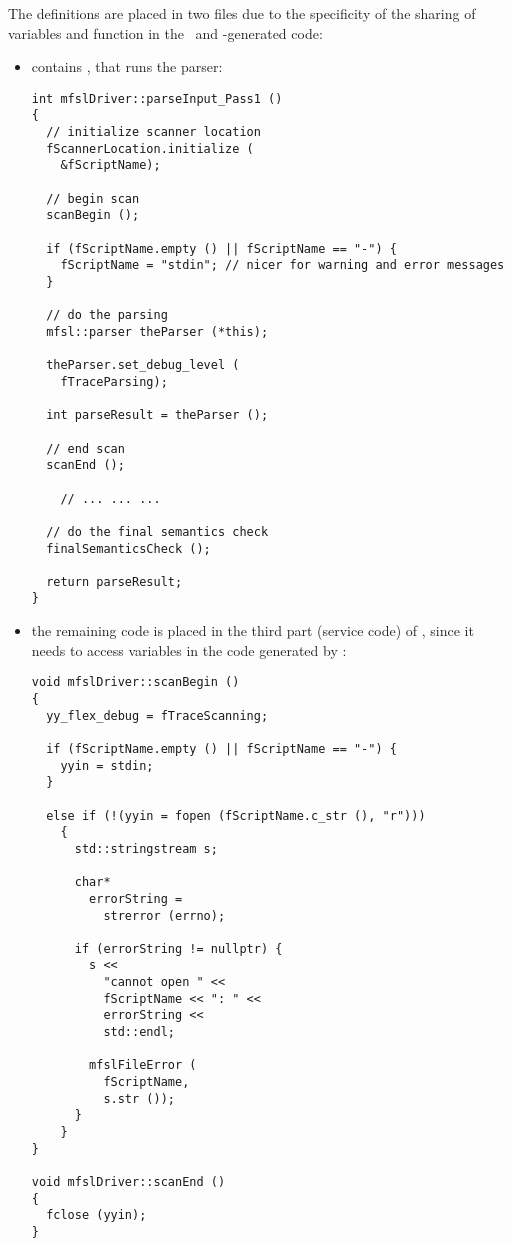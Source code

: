 The definitions are placed in two files due to the specificity of the sharing of variables and function in the \flex\ and \bison-generated code: %
\begin{itemize}

\item {} contains , that runs the parser:
\begin{lstlisting}[language=CPlusPlus]
int mfslDriver::parseInput_Pass1 ()
{
  // initialize scanner location
  fScannerLocation.initialize (
    &fScriptName);

  // begin scan
  scanBegin ();

  if (fScriptName.empty () || fScriptName == "-") {
    fScriptName = "stdin"; // nicer for warning and error messages
  }

  // do the parsing
  mfsl::parser theParser (*this);

  theParser.set_debug_level (
    fTraceParsing);

  int parseResult = theParser ();

  // end scan
  scanEnd ();

	// ... ... ...

  // do the final semantics check
  finalSemanticsCheck ();

  return parseResult;
}
\end{lstlisting}

\item the remaining code is placed in the third part (service code) of , since it needs to access variables in the code generated by \flex:
\begin{lstlisting}[language=CPlusPlus]
void mfslDriver::scanBegin ()
{
  yy_flex_debug = fTraceScanning;

  if (fScriptName.empty () || fScriptName == "-") {
    yyin = stdin;
  }

  else if (!(yyin = fopen (fScriptName.c_str (), "r")))
    {
      std::stringstream s;

      char*
        errorString =
          strerror (errno);

      if (errorString != nullptr) {
        s <<
          "cannot open " <<
          fScriptName << ": " <<
          errorString <<
          std::endl;

        mfslFileError (
          fScriptName,
          s.str ());
      }
    }
}

void mfslDriver::scanEnd ()
{
  fclose (yyin);
}
\end{lstlisting}

\end{itemize}


